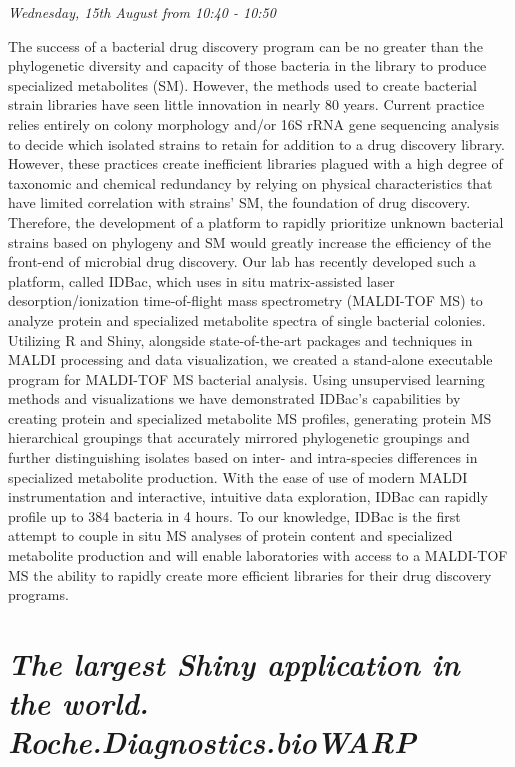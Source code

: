 \documentclass[]{book}
\theoremstyle{definition}
\theoremstyle{definition}
\theoremstyle{definition}
\theoremstyle{remark}
\begin{document}
\emph{Wednesday, 15th August from 10:40 - 10:50}

The success of a bacterial drug discovery program can be no greater than
the phylogenetic diversity and capacity of those bacteria in the library
to produce specialized metabolites (SM). However, the methods used to
create bacterial strain libraries have seen little innovation in nearly
80 years. Current practice relies entirely on colony morphology and/or
16S rRNA gene sequencing analysis to decide which isolated strains to
retain for addition to a drug discovery library. However, these
practices create inefficient libraries plagued with a high degree of
taxonomic and chemical redundancy by relying on physical characteristics
that have limited correlation with strains' SM, the foundation of drug
discovery. Therefore, the development of a platform to rapidly
prioritize unknown bacterial strains based on phylogeny and SM would
greatly increase the efficiency of the front-end of microbial drug
discovery. Our lab has recently developed such a platform, called IDBac,
which uses in situ matrix-assisted laser desorption/ionization
time-of-flight mass spectrometry (MALDI-TOF MS) to analyze protein and
specialized metabolite spectra of single bacterial colonies. Utilizing R
and Shiny, alongside state-of-the-art packages and techniques in MALDI
processing and data visualization, we created a stand-alone executable
program for MALDI-TOF MS bacterial analysis. Using unsupervised learning
methods and visualizations we have demonstrated IDBac's capabilities by
creating protein and specialized metabolite MS profiles, generating
protein MS hierarchical groupings that accurately mirrored phylogenetic
groupings and further distinguishing isolates based on inter- and
intra-species differences in specialized metabolite production. With the
ease of use of modern MALDI instrumentation and interactive, intuitive
data exploration, IDBac can rapidly profile up to 384 bacteria in 4
hours. To our knowledge, IDBac is the first attempt to couple in situ MS
analyses of protein content and specialized metabolite production and
will enable laboratories with access to a MALDI-TOF MS the ability to
rapidly create more efficient libraries for their drug discovery
programs.

\hypertarget{the-largest-shiny-application-in-the-world.-roche.diagnostics.biowarp-1}{%
\section{\texorpdfstring{\emph{The largest Shiny application in the
world.
Roche.Diagnostics.bioWARP}}{The largest Shiny application in the world. Roche.Diagnostics.bioWARP}}\label{the-largest-shiny-application-in-the-world.-roche.diagnostics.biowarp-1}}
\end{document}
